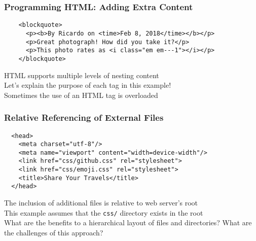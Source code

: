 \documentclass[14pt,aspectratio=169]{beamer}
\begin{document}
%
\begin{frame}[fragile]
  \frametitle{Programming HTML: Adding Extra Content}
  \normalsize
  \hspace*{-.25in}
  \begin{minipage}{6in}
    \vspace*{.25in}
    \begin{verbatim}
    <blockquote>
      <p><b>By Ricardo on <time>Feb 8, 2018</time></b></p>
      <p>Great photograph! How did you take it?</p>
      <p>This photo rates as <i class="em em---1"></i></p>
    </blockquote>
    \end{verbatim}
  \end{minipage}
  \vspace*{.05in}
  \begin{center}
    \normalsize \noindent HTML supports multiple levels of nesting content \\
    \normalsize \noindent Let's explain the purpose of each tag in this example! \\
    \normalsize \noindent Sometimes the use of an HTML tag is overloaded \\
  \end{center}
\end{frame}

%
\begin{frame}[fragile]
  \frametitle{Relative Referencing of External Files}
  \normalsize
  \hspace*{-.25in}
  \begin{minipage}{6in}
    \vspace*{.25in}
    \begin{verbatim}
  <head>
    <meta charset="utf-8"/>
    <meta name="viewport" content="width=device-width"/>
    <link href="css/github.css" rel="stylesheet">
    <link href="css/emoji.css" rel="stylesheet">
    <title>Share Your Travels</title>
  </head>
    \end{verbatim}
  \end{minipage}
  \vspace*{.05in}
  \begin{center}
    \normalsize \noindent The inclusion of additional files is relative to web
    server's root\\
    \normalsize \noindent This example assumes that the {\tt css/} directory
    exists in the root\\
    \normalsize \noindent What are the benefits to a hierarchical layout of
    files and directories? What are the challenges of this approach?\\
  \end{center}
\end{frame}
\end{document}
